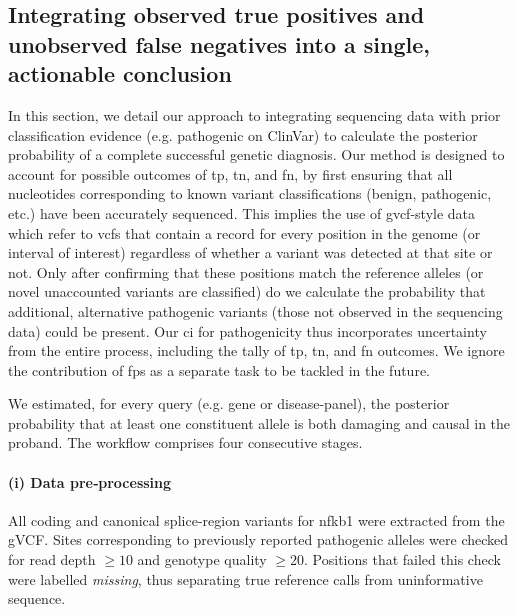 \subsection{Integrating observed true positives and unobserved false negatives into a single, actionable conclusion}

In this section, we detail our approach to integrating sequencing data with prior classification evidence (e.g. pathogenic on ClinVar) to calculate the posterior probability of a complete successful genetic diagnosis.
Our method is designed to account for possible outcomes of 
\ac{tp},
\ac{tn},
and \ac{fn},
by first ensuring that all nucleotides corresponding to known variant classifications (benign, pathogenic, etc.) have been accurately sequenced. 
This implies the use of \ac{gvcf}-style data which refer to \ac{vcf}s that contain a record for every position in the genome (or interval of interest) regardless of whether a variant was detected at that site or not.
Only after confirming that these positions match the reference alleles (or novel unaccounted variants are classified) do we calculate the probability that additional, alternative pathogenic variants (those not observed in the sequencing data) could be present. 
Our \ac{ci} for pathogenicity thus incorporates uncertainty from the entire process, including the tally of \ac{tp}, \ac{tn}, and \ac{fn} outcomes.
We ignore the contribution of \ac{fp}s  as a separate task to be tackled in the future.

We estimated, for every query (e.g. gene or disease-panel), the posterior probability that at least one constituent allele is both damaging and causal in the proband.  
The workflow comprises four consecutive stages.

\paragraph{(i) Data pre‑processing}
All coding and canonical splice‑region variants for \ac{nfkb1} were extracted from the gVCF.  Sites corresponding to previously reported pathogenic alleles were checked for read depth \mbox{$\ge\!10$} and genotype quality \mbox{$\ge\!20$}.  Positions that failed this check were labelled \emph{missing}, thus separating true reference calls from uninformative sequence.

